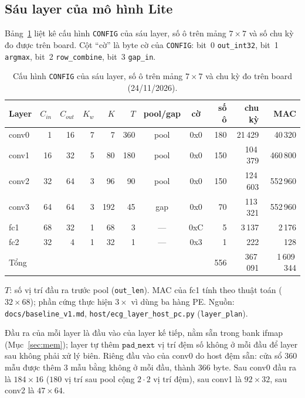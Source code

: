 \subsection{Sáu layer của mô hình Lite}
Bảng~\ref{tab:layers} liệt kê cấu hình \texttt{CONFIG} của sáu layer, số ô trên mảng $7\times7$ và số chu kỳ đo được trên board.
Cột ``cờ'' là byte cờ của \texttt{CONFIG}: bit~0 \texttt{out\_int32}, bit~1 \texttt{argmax}, bit~2 \texttt{row\_combine}, bit~3 \texttt{gap\_in}.

\begin{table}[htbp]\centering
\caption{Cấu hình \texttt{CONFIG} của sáu layer, số ô trên mảng $7\times7$ và chu kỳ đo trên board (24/11/2026).}\label{tab:layers}
\footnotesize\setlength{\tabcolsep}{3.5pt}
\begin{tabular}{@{}lrrrrrccrrr@{}}
\toprule
Layer & $C_{in}$ & $C_{out}$ & $K_w$ & $K$ & $T$ & pool/gap & cờ & số ô & chu kỳ & MAC \\ \midrule
conv0 & 1  & 16 & 7 & 7   & 360 & pool & 0x0 & 180 & 21\,429  & 40\,320 \\
conv1 & 16 & 32 & 5 & 80  & 180 & pool & 0x0 & 150 & 104\,379 & 460\,800 \\
conv2 & 32 & 64 & 3 & 96  & 90  & pool & 0x0 & 150 & 124\,603 & 552\,960 \\
conv3 & 64 & 64 & 3 & 192 & 45  & gap  & 0x0 & 70  & 113\,321 & 552\,960 \\
fc1   & 68 & 32 & 1 & 68  & 3   & ---  & 0xC & 5   & 3\,137   & 2\,176 \\
fc2   & 32 & 4  & 1 & 32  & 1   & ---  & 0x3 & 1   & 222      & 128 \\ \midrule
Tổng  &    &    &   &     &     &      &     & 556 & 367\,091 & 1\,609\,344 \\ \bottomrule
\end{tabular}

\smallskip
\footnotesize $T$: số vị trí đầu ra trước pool (\texttt{out\_len}).
MAC của fc1 tính theo thuật toán ($32\times68$); phần cứng thực hiện $3\times$ vì dùng ba hàng PE.
Nguồn: \texttt{docs/baseline\_v1.md}, \texttt{host/ecg\_layer\_host\_pc.py} (\texttt{layer\_plan}).
\end{table}

Đầu ra của mỗi layer là đầu vào của layer kế tiếp, nằm sẵn trong bank ifmap (Mục~\ref{sec:mem}); layer tự thêm $\texttt{pad\_next}$ vị trí đệm số không ở mỗi đầu để layer sau không phải xử lý biên.
Riêng đầu vào của conv0 do host đệm sẵn: cửa sổ $360$ mẫu được thêm $3$ mẫu bằng không ở mỗi đầu, thành $366$ byte.
Sau conv0 đầu ra là $184\times16$ ($180$ vị trí sau pool cộng $2\cdot2$ vị trí đệm), sau conv1 là $92\times32$, sau conv2 là $47\times64$.


